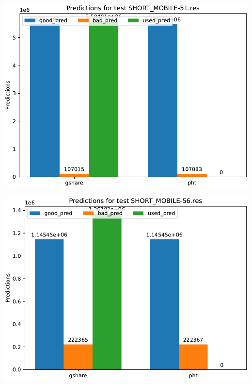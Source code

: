 \documentclass[a4paper]{article}
\begin{document}
\begin{minipage}{.48\linewidth}
\includegraphics[width=\linewidth]{graphs/dual-predictor/preds_SHORT_MOBILE-51.res.pdf}
\end{minipage}%
\hfill
\begin{minipage}{.48\linewidth}
\includegraphics[width=\linewidth]{graphs/dual-predictor/preds_SHORT_MOBILE-56.res.pdf}
\end{minipage}
\end{document}
